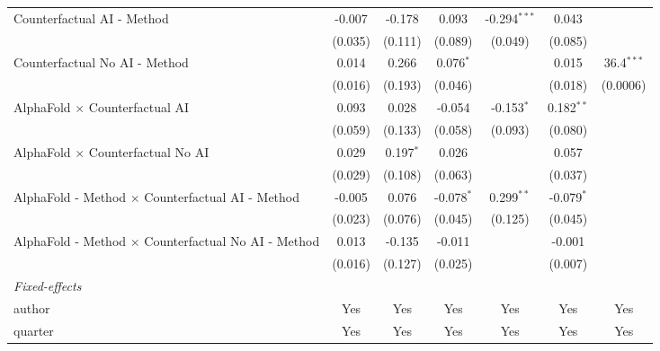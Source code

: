 \begin{tabular}{lcccccc}
   Counterfactual AI - Method                                 & -0.007  & -0.178      & 0.093        & -0.294$^{***}$ & 0.043        &   \\   
                                                              & (0.035) & (0.111)     & (0.089)      & (0.049)        & (0.085)      &   \\   
   Counterfactual No AI - Method                              & 0.014   & 0.266       & 0.076$^{*}$  &                & 0.015        & 36.4$^{***}$\\   
                                                              & (0.016) & (0.193)     & (0.046)      &                & (0.018)      & (0.0006)\\   
   AlphaFold $\times$ Counterfactual AI                       & 0.093   & 0.028       & -0.054       & -0.153$^{*}$   & 0.182$^{**}$ &   \\   
                                                              & (0.059) & (0.133)     & (0.058)      & (0.093)        & (0.080)      &   \\   
   AlphaFold $\times$ Counterfactual No AI                    & 0.029   & 0.197$^{*}$ & 0.026        &                & 0.057        &   \\   
                                                              & (0.029) & (0.108)     & (0.063)      &                & (0.037)      &   \\   
   AlphaFold - Method $\times$ Counterfactual AI - Method     & -0.005  & 0.076       & -0.078$^{*}$ & 0.299$^{**}$   & -0.079$^{*}$ &   \\   
                                                              & (0.023) & (0.076)     & (0.045)      & (0.125)        & (0.045)      &   \\   
   AlphaFold - Method $\times$ Counterfactual No AI - Method  & 0.013   & -0.135      & -0.011       &                & -0.001       &   \\   
                                                              & (0.016) & (0.127)     & (0.025)      &                & (0.007)      &   \\   
   \midrule
   \emph{Fixed-effects}\\
   author                                                     & Yes     & Yes         & Yes          & Yes            & Yes          & Yes\\  
   quarter                                                    & Yes     & Yes         & Yes          & Yes            & Yes          & Yes\\  

\end{tabular}
